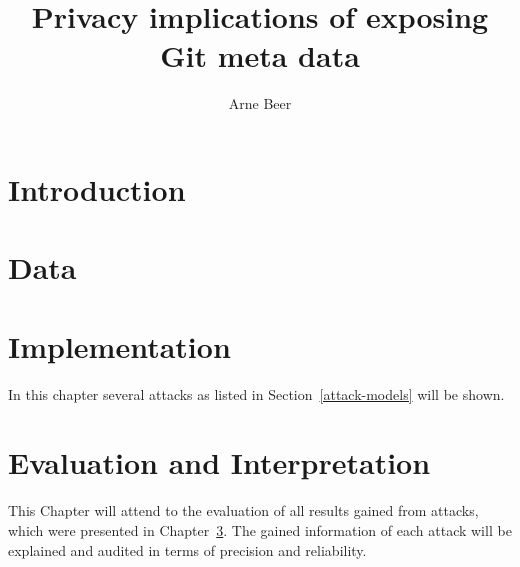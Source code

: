 \documentclass{thesis}
\title{Privacy implications of exposing Git meta data}
\author{Arne Beer}
\begin{document}

\cleardoublepage{}


\clearpage



{\small \tableofcontents}



\chapter{Introduction}




\chapter{Data}






\chapter{Implementation}\label{implementation}
In this chapter several attacks as listed in Section~\ref{attack-models} will be shown.




\chapter{Evaluation and Interpretation}\label{evaluation}
This Chapter will attend to the evaluation of all results gained from attacks, which were presented in Chapter~\ref{implementation}.
The gained information of each attack will be explained and audited in terms of precision and reliability.






\begingroup
    \footnotesize
    \listoffigures
    \let\clearpage\relax
    \listoflistings{}
    \listoftables
\endgroup

\renewcommand*{\bibfont}{\footnotesize}
\printbibliography{}



\end{document}
